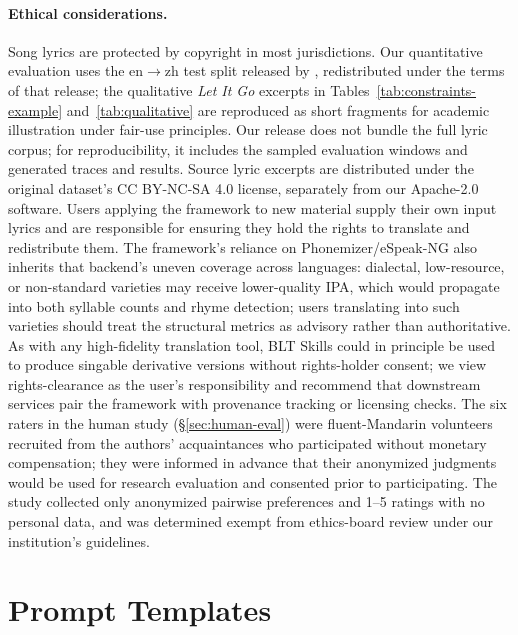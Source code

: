 \documentclass[11pt]{article}
\begin{document}
\paragraph{Ethical considerations.}
Song lyrics are protected by copyright in most jurisdictions.
Our quantitative evaluation uses the en$\rightarrow$zh test split released by \citet{ou-etal-2023-songs}, redistributed under the terms of that release; the qualitative \emph{Let It Go} excerpts in Tables~\ref{tab:constraints-example} and~\ref{tab:qualitative} are reproduced as short fragments for academic illustration under fair-use principles.
Our release does not bundle the full lyric corpus; for reproducibility, it includes the sampled evaluation windows and generated traces and results. Source lyric excerpts are distributed under the original dataset's CC BY-NC-SA 4.0 license, separately from our Apache-2.0 software. Users applying the framework to new material supply their own input lyrics and are responsible for ensuring they hold the rights to translate and redistribute them.
The framework's reliance on Phonemizer/eSpeak-NG also inherits that backend's uneven coverage across languages: dialectal, low-resource, or non-standard varieties may receive lower-quality IPA, which would propagate into both syllable counts and rhyme detection; users translating into such varieties should treat the structural metrics as advisory rather than authoritative.
As with any high-fidelity translation tool, BLT Skills could in principle be used to produce singable derivative versions without rights-holder consent; we view rights-clearance as the user's responsibility and recommend that downstream services pair the framework with provenance tracking or licensing checks.
The six raters in the human study (\S\ref{sec:human-eval}) were fluent-Mandarin volunteers recruited from the authors' acquaintances who participated without monetary compensation; they were informed in advance that their anonymized judgments would be used for research evaluation and consented prior to participating.
The study collected only anonymized pairwise preferences and 1--5 ratings with no personal data, and was determined exempt from ethics-board review under our institution's guidelines.



\appendix

\section{Prompt Templates}
\label{app:prompts}
\end{document}
